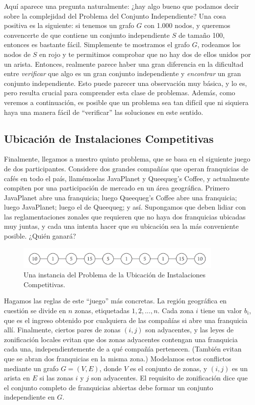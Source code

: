 \documentclass[a4paper, 12pt]{book}
\begin{document}
Aquí aparece una pregunta naturalmente: ¿hay algo bueno que podamos decir sobre la complejidad del Problema del Conjunto Independiente? Una cosa positiva es la siguiente: si tenemos un grafo $G$ con 1.000 nodos, y queremos convencerte de que contiene un conjunto independiente $S$ de tamaño 100, entonces es bastante fácil. Simplemente te mostramos el grafo $G$, rodeamos los nodos de $S$ en rojo y te permitimos comprobar que no hay dos de ellos unidos por un arista. Entonces, realmente parece haber una gran diferencia en la dificultad entre \textit{verificar} que algo es un gran conjunto independiente y \textit{encontrar} un gran conjunto independiente. Esto puede parecer una observación muy básica, y lo es, pero resulta crucial para comprender esta clase de problemas. Además, como veremos a continuación, es posible que un problema sea tan difícil que ni siquiera haya una manera fácil de ``verificar'' las soluciones en este sentido.

\subsection*{Ubicación de Instalaciones Competitivas}
%
Finalmente, llegamos a nuestro quinto problema, que se basa en el siguiente juego de dos participantes. Considere dos grandes compañías que operan franquicias de cafés en todo el país, llamémoslas JavaPlanet y Queequeg's Coffee, y actualmente compiten por una participación de mercado en un área geográfica. Primero JavaPlanet abre una franquicia; luego Queequeg's Coffee abre una franquicia; luego JavaPlanet; luego el de Queequeg; y así. Supongamos que deben lidiar con las reglamentaciones zonales que requieren que no haya dos franquicias ubicadas muy juntas, y cada una intenta hacer que su ubicación sea la más conveniente posible. ¿Quién ganará?

\begin{figure}[h]
\centering
\includegraphics[width=0.9\textwidth]{Imagenes-Seccion1/fig1-7.PNG}
\caption{Una instancia del Problema de la Ubicación de Instalaciones Competitivas.}
\label{fig:Imagenes-Seccion1/fig1-7.PNG}
\end{figure}

Hagamos las reglas de este ``juego'' más concretas. La región geográfica en cuestión se divide en $n$ zonas, etiquetadas $1, 2,. . . ,n$. Cada zona $i$ tiene un valor $b_i$, que es el ingreso obtenido por cualquiera de las compañías si abre una franquicia allí. Finalmente, ciertos pares de zonas $(i,j)$ son adyacentes, y las leyes de zonificación locales evitan que dos zonas adyacentes contengan una franquicia cada una, independientemente de a qué compañía pertenecen. (También evitan que se abran dos franquicias en la misma zona.) Modelamos estos conflictos mediante un grafo $G=(V,E)$, donde $V$ es el conjunto de zonas, y $(i,j)$ es un arista en $E$ si las zonas $i$ y $j$ son adyacentes. El requisito de zonificación dice que el conjunto completo de franquicias abiertas debe formar un conjunto independiente en $G$.
\end{document}
